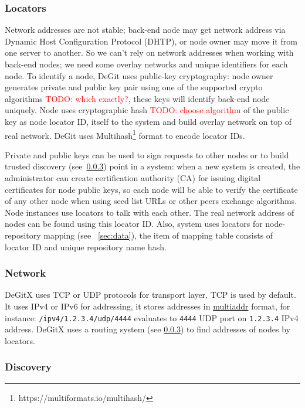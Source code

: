 \documentclass[acmlarge, screen, nonacm, 11pt]{acmart}
\newcommand{\code}[1]{\texttt{#1}}
\newcommand{\todo}[1]{\textcolor{red}{TODO: #1}}
\begin{document}
\subsubsection{Locators}\label{sec:locators}
Network addresses are not stable; back-end node may get network address via
Dynamic Host Configuration Protocol (DHTP), or node owner may move it from one server to another.
So we can't rely on network addresses when working with back-end nodes; we need some
overlay networks and unique identifiers for each node. To identify a node, DeGit uses
public-key cryptography: node owner generates private and public key pair using one of the supported
crypto algorithms \todo{which exactly?}, these keys will identify back-end node uniquely.
Node uses cryptographic hash \todo{choose algorithm} of the public key as node locator ID,
itself to the system and build overlay network on top of real network. DeGit uses
Multihash\footnote{https://multiformats.io/multihash/} format to encode locator IDs.

Private and public keys can be used to sign requests to other nodes or to build
trusted discovery (see~\ref{sec:discovery}) point in a system: when a new system is created,
the administrator can create certification authority (CA) for issuing digital certificates for node
public keys, so each node will be able to verify the certificate of any other node when
using seed list URLs or other peers exchange algorithms. Node instances use locators to talk
with each other. The real network address of nodes can be found using this locator ID.
Also, system uses locators for node-repository mapping (see ~\ref{sec:data}),
the item of mapping table consists of locator ID and unique repository name hash.

\subsubsection{Network}\label{sec:network}

DeGitX uses TCP or UDP protocols for transport layer, TCP is used by default. It uses IPv4 or IPv6 for addressing,
it stores addresses in \href{https://github.com/multiformats/multiaddr}{multiaddr} format, for instance:
\code{/ipv4/1.2.3.4/udp/4444} evaluates to \code{4444} UDP port on \code{1.2.3.4} IPv4 address.
DeGitX uses a routing system (see \ref{sec:discovery}) to find addresses of nodes by locators.

\subsubsection{Discovery}\label{sec:discovery}
\end{document}
